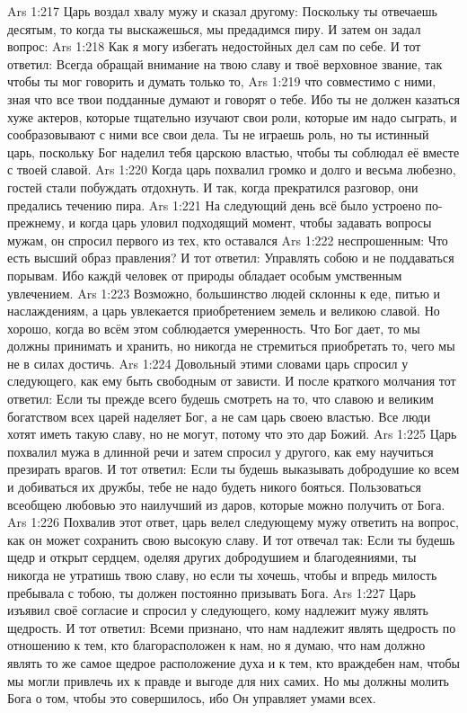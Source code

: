 \vs Ars 1:217
Царь воздал хвалу мужу и сказал другому: Поскольку ты отвечаешь десятым, то когда ты выскажешься, мы предадимся пиру. И затем он задал вопрос:
\vs Ars 1:218
Как я могу избегать недостойных дел сам по себе. И тот ответил: Всегда обращай внимание на твою славу и твоё верховное звание, так чтобы ты мог говорить и думать только то,
\vs Ars 1:219
что совместимо с ними, зная что все твои подданные думают и говорят о тебе. Ибо ты не должен казаться хуже актеров, которые тщательно изучают свои роли, которые им надо сыграть, и сообразовывают с ними все свои дела. Ты не играешь роль, но ты истинный царь, поскольку Бог наделил тебя царскою властью, чтобы ты соблюдал её вместе с твоей славой.
\vs Ars 1:220
Когда царь похвалил громко и долго и весьма любезно, гостей стали побуждать отдохнуть. И так, когда прекратился разговор, они предались течению пира.
\vs Ars 1:221
На следующий день всё было устроено по-прежнему, и когда царь уловил подходящий момент, чтобы задавать вопросы мужам, он спросил первого из тех, кто оставался
\vs Ars 1:222
неспрошенным: Что есть высший образ правления? И тот ответил: Управлять собою и не поддаваться порывам. Ибо каждй человек от природы обладает особым умственным увлечением.
\vs Ars 1:223
Возможно, большинство людей склонны к еде, питью и наслаждениям, а царь увлекается приобретением земель и великою славой. Но хорошо, когда во всём этом соблюдается умеренность. Что Бог дает, то мы должны принимать и хранить, но никогда не стремиться приобретать то, чего мы не в силах достичь.
\vs Ars 1:224
Довольный этими словами царь спросил у следующего, как ему быть свободным от зависти. И после краткого молчания тот ответил: Если ты прежде всего будешь смотреть на то, что славою и великим богатством всех царей наделяет Бог, а не сам царь своею властью. Все люди хотят иметь такую славу, но не могут, потому что это дар Божий.
\vs Ars 1:225
Царь похвалил мужа в длинной речи и затем спросил у другого, как ему научиться презирать врагов. И тот ответил: Если ты будешь выказывать добродушие ко всем и добиваться их дружбы, тебе не надо будеть никого бояться. Пользоваться всеобщею любовью это наилучший из даров, которые можно получить от Бога.
\vs Ars 1:226
Похвалив этот ответ, царь велел следующему мужу ответить на вопрос, как он может сохранить свою высокую славу. И тот отвечал так: Если ты будешь щедр и открыт сердцем, оделяя других добродушием и благодеяниями, ты никогда не утратишь твою славу, но если ты хочешь, чтобы и впредь милость пребывала с тобою, ты должен постоянно призывать Бога.
\vs Ars 1:227
Царь изъявил своё согласие и спросил у следующего, кому надлежит мужу являть щедрость. И тот ответил: Всеми признано, что нам надлежит являть щедрость по отношению к тем, кто благорасположен к нам, но я думаю, что нам должно являть то же самое щедрое расположение духа и к тем, кто враждебен нам, чтобы мы могли привлечь их к правде и выгоде для них самих. Но мы должны молить Бога о том, чтобы это совершилось, ибо Он управляет умами всех.
